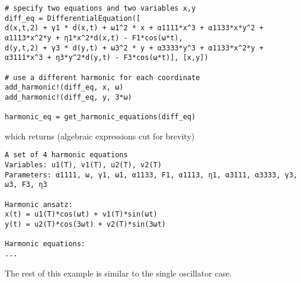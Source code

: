 \begin{lstlisting}[numbers=none]
# specify two equations and two variables x,y
diff_eq = DifferentialEquation([
d(x,t,2) + γ1 * d(x,t) + ω1^2 * x + α1111*x^3 + α1133*x*y^2 + α1113*x^2*y + η1*x^2*d(x,t) - F1*cos(ω*t), 
d(y,t,2) + γ3 * d(y,t) + ω3^2 * y + α3333*y^3 + α1133*x^2*y + α3111*x^3 + η3*y^2*d(y,t) - F3*cos(ω*t)], [x,y])

# use a different harmonic for each coordinate
add_harmonic!(diff_eq, x, ω)
add_harmonic!(diff_eq, y, 3*ω)

harmonic_eq = get_harmonic_equations(diff_eq)
\end{lstlisting}
which returns (algebraic expressions cut for brevity)
\begin{lstlisting}[numbers=none, basicstyle=\scriptsize\ttfamily]
A set of 4 harmonic equations
Variables: u1(T), v1(T), u2(T), v2(T)
Parameters: α1111, ω, γ1, ω1, α1133, F1, α1113, η1, α3111, α3333, γ3, ω3, F3, η3

Harmonic ansatz: 
x(t) = u1(T)*cos(ωt) + v1(T)*sin(ωt)
y(t) = u2(T)*cos(3ωt) + v2(T)*sin(3ωt)

Harmonic equations:
...
\end{lstlisting}
The rest of this example is similar to the single oscillator case. 

